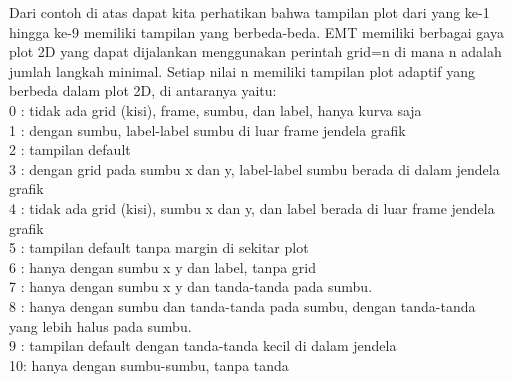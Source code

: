 \documentclass{article}
\begin{document}
\begin{eulernotebook}
\begin{eulercomment}
Dari contoh di atas dapat kita perhatikan bahwa tampilan plot dari
yang ke-1 hingga ke-9 memiliki tampilan yang berbeda-beda. EMT
memiliki berbagai gaya plot 2D yang dapat dijalankan menggunakan
perintah grid=n di mana n adalah jumlah langkah minimal. Setiap nilai
n memiliki tampilan plot adaptif yang berbeda dalam plot 2D, di
antaranya yaitu:\\
0 : tidak ada grid (kisi), frame, sumbu, dan label, hanya kurva saja\\
1 : dengan sumbu, label-label sumbu di luar frame jendela grafik\\
2 : tampilan default\\
3 : dengan grid pada sumbu x dan y, label-label sumbu berada di dalam
jendela grafik\\
4 : tidak ada grid (kisi), sumbu x dan y, dan label berada di luar
frame jendela grafik\\
5 : tampilan default tanpa margin di sekitar plot\\
6 : hanya dengan sumbu x y dan label, tanpa grid\\
7 : hanya dengan sumbu x y dan tanda-tanda pada sumbu.\\
8 : hanya dengan sumbu dan tanda-tanda pada sumbu, dengan tanda-tanda\\
yang lebih halus pada sumbu.\\
9 : tampilan default dengan tanda-tanda kecil di dalam jendela\\
10: hanya dengan sumbu-sumbu, tanpa tanda


\end{eulercomment}
\end{eulernotebook}
\end{document}
